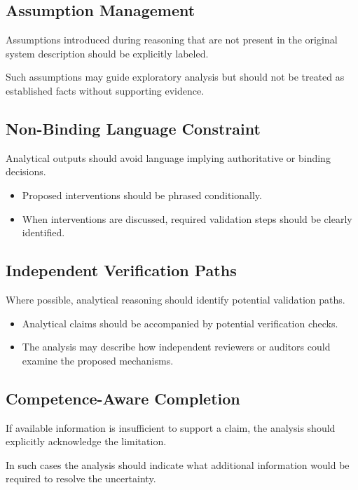 \subsection{Assumption Management}

Assumptions introduced during reasoning that are not present in the
original system description should be explicitly labeled.

Such assumptions may guide exploratory analysis but should not be treated
as established facts without supporting evidence.

\subsection{Non-Binding Language Constraint}

Analytical outputs should avoid language implying authoritative or
binding decisions.

\begin{itemize}
\item Proposed interventions should be phrased conditionally.
\item When interventions are discussed, required validation steps should
be clearly identified.
\end{itemize}

\subsection{Independent Verification Paths}

Where possible, analytical reasoning should identify potential validation
paths.

\begin{itemize}
\item Analytical claims should be accompanied by potential verification
checks.
\item The analysis may describe how independent reviewers or auditors
could examine the proposed mechanisms.
\end{itemize}

\subsection{Competence-Aware Completion}

If available information is insufficient to support a claim, the analysis
should explicitly acknowledge the limitation.

In such cases the analysis should indicate what additional information
would be required to resolve the uncertainty.

